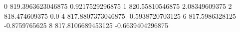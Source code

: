 0 819.3963623046875 0.9217529296875
1 820.55810546875 2.08349609375
2 818.474609375 0.0
4 817.8807373046875 -0.5938720703125
6 817.5986328125 -0.8759765625
8 817.8106689453125 -0.6639404296875
